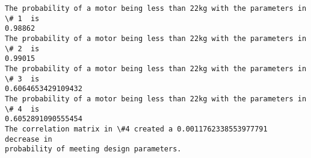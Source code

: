 \documentclass[11pt]{article}
\makeatletter
\newcommand{\boxspacing}{\kern\kvtcb@left@rule\kern\kvtcb@boxsep}
\newcommand{\prompt}[4]{
        \ttfamily\llap{{\color{#2}[#3]:\hspace{3pt}#4}}\vspace{-\baselineskip}
    }
\makeatother
\begin{document}
    \begin{Verbatim}[commandchars=\\\{\}]
The probability of a motor being less than 22kg with the parameters in \# 1  is
0.98862
The probability of a motor being less than 22kg with the parameters in \# 2  is
0.99015
The probability of a motor being less than 22kg with the parameters in \# 3  is
0.6064653429109432
The probability of a motor being less than 22kg with the parameters in \# 4  is
0.6052891090555454
The correlation matrix in \#4 created a 0.0011762338553977791  decrease in
probability of meeting design parameters.
    \end{Verbatim}

    \begin{tcolorbox}[breakable, size=fbox, boxrule=1pt, pad at break*=1mm,colback=cellbackground, colframe=cellborder]
\prompt{In}{incolor}{ }{\boxspacing}
\begin{Verbatim}[commandchars=\\\{\}]

\end{Verbatim}
\end{tcolorbox}


    
    
    
\end{document}
